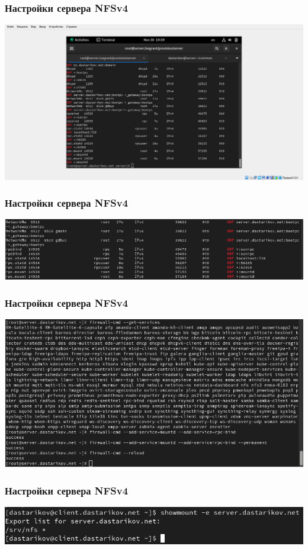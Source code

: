 \begin{frame}
\frametitle{Настройки сервера NFSv4}
    \includegraphics[width=\textwidth]{../images/image30.png}
\end{frame}


\begin{frame}
\frametitle{Настройки сервера NFSv4}
    \includegraphics[width=\textwidth]{../images/image31.png}
\end{frame}


\begin{frame}
\frametitle{Настройки сервера NFSv4}
    \includegraphics[width=\textwidth]{../images/image05.png}
\end{frame}


\begin{frame}
\frametitle{Настройки сервера NFSv4}
    \includegraphics[width=\textwidth]{../images/image06.png}
\end{frame}

